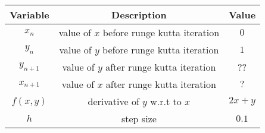 \begin{tabular}[12.1pt]{ |c| c| c|}
    \hline
    \textbf{Variable} & \textbf{Description} &\textbf{Value}\\ 
    \hline
    $x_{n}$ & value of $x$ before runge kutta iteration & $0$ \\
    \hline 
    $y_n$ & value of $y$ before runge kutta iteration  &$1$ \\
    \hline 
    $y_{n+1}$ & value of $y$ after runge kutta iteration & $?$?\\
    \hline
   $x_{n+1}$ & value of $x$ after runge kutta iteration  & $?$\\
   \hline
   $f(x,y)$ &derivative of $y$ w.r.t to $x$ & $2x+y$\\
   \hline
   $h$ & step size & $0.1$\\
   \hline
    \end{tabular}

